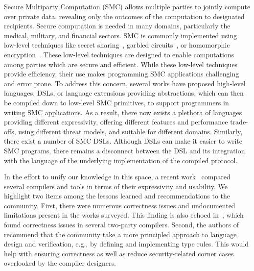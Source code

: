 

Secure Multiparty Computation (SMC) allows multiple parties to jointly compute over private data, revealing only the outcomes of the computation to designated recipients. Secure computation is needed in many domains, particularly the medical, military, and financial sectors. 
SMC is commonly implemented using low-level techniques like secret sharing~\cite{Shamir79}, garbled circuits~\cite{Yao86}, or homomorphic encryption~\cite{ElGamal85,Paillier99}. 
These low-level techniques are designed to enable computations among parties which are secure and efficient. While these low-level techniques provide efficiency, their use makes programming SMC applications challenging and error prone. 
To address this concern, several works have proposed high-level languages, DSLs, or language extensions providing abstractions, which can then be compiled down to low-level SMC primitives, to support programmers in writing SMC applications. 
As a result, there now exists a plethora of languages providing different expressivity, offering different features and performance trade-offs, using different threat models, and suitable for different domains.
 Similarly, there exist a number of SMC DSLs.  Although DSLs can make it easier to write SMC programs, there remains a disconnect between the DSL and its integration with the language of the underlying implementation of the compiled protocol. 

In the effort to unify our knowledge in this space, a recent work~\cite{HastingsHNZ19} compared several compilers and tools in terms of their expressivity and usability. We highlight two items among the lessons learned and recommendations to the community. First, there were numerous correctness issues and undocumented limitations present in the works surveyed. This finding is also echoed in~\cite{Mood16}, which found correctness issues in several two-party compilers. Second, the authors of~\cite{HastingsHNZ19} recommend that the community take a more principled approach to language design and verification, e.g., by defining and implementing type rules. This would help with ensuring correctness as well as reduce security-related corner cases overlooked by the compiler designers. 

